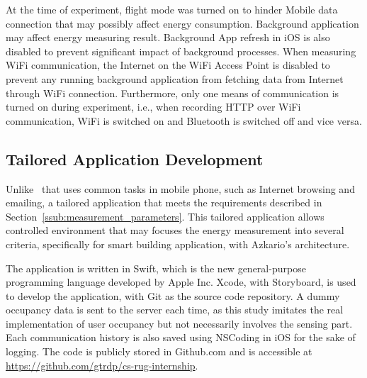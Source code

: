 \documentclass[journal]{vgtc}                %
\begin{document}
At the time of experiment, flight mode was turned on to hinder Mobile data connection that may possibly affect energy consumption.  Background application may affect energy measuring result. Background App refresh in iOS is also disabled to prevent significant impact of background processes. When measuring WiFi communication, the Internet on the WiFi Access Point is disabled to prevent any running background application from fetching data from Internet through WiFi connection. Furthermore, only one means of communication is turned on during experiment, i.e., when recording HTTP over WiFi communication, WiFi is switched on and Bluetooth is switched off and vice versa.


\subsection{Tailored Application Development} %
\label{sub:tailored_application_development}
Unlike~\cite{Balasubramanian2009} that uses common tasks in mobile phone, such as Internet browsing and emailing, a tailored application that meets the requirements described in Section~\ref{ssub:measurement_parameters}. This tailored application allows controlled environment that may focuses the energy measurement into several criteria, specifically for smart building application, with Azkario's architecture.

The application is written in Swift, which is the new general-purpose programming language developed by Apple Inc. Xcode, with Storyboard, is used to develop the application, with Git as the source code repository. A dummy occupancy data is sent to the server each time, as this study imitates the real implementation of user occupancy but not necessarily involves the sensing part. Each communication history is also saved using NSCoding in iOS for the sake of logging. The code is publicly stored in Github.com and is accessible at \url{https://github.com/gtrdp/cs-rug-internship}.
\end{document}
